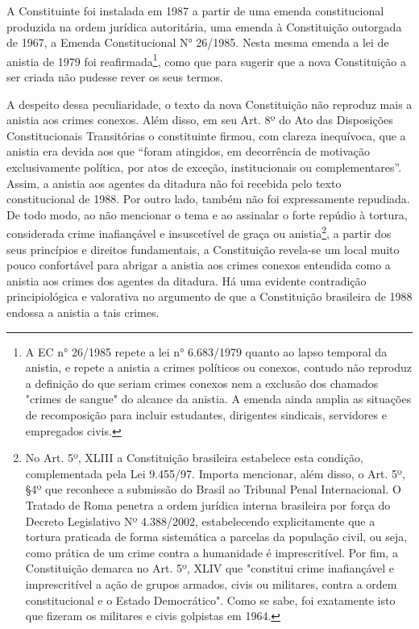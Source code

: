 A Constituinte foi instalada em 1987 a partir de uma emenda
constitucional produzida na ordem jurídica autoritária, uma emenda à
Constituição outorgada de 1967, a Emenda Constitucional N° 26/1985.
Nesta mesma emenda a lei de anistia de 1979 foi reafirmada\footnote{A EC
  n° 26/1985 repete a lei n° 6.683/1979 quanto ao lapso temporal da
  anistia, e repete a anistia a crimes políticos ou conexos, contudo não
  reproduz a definição do que seriam crimes conexos nem a exclusão dos
  chamados "crimes de sangue" do alcance da anistia. A emenda ainda
  amplia as situações de recomposição para incluir estudantes,
  dirigentes sindicais, servidores e empregados civis.}, como que para
sugerir que a nova Constituição a ser criada não pudesse rever os seus
termos.

A despeito dessa peculiaridade, o texto da nova Constituição não
reproduz mais a anistia aos crimes conexos. Além disso, em seu Art. 8º
do Ato das Disposições Constitucionais Transitórias o constituinte
firmou, com clareza inequívoca, que a anistia era devida aos que ``foram
atingidos, em decorrência de motivação exclusivamente política, por atos
de exceção, institucionais ou complementares''. Assim, a anistia aos
agentes da ditadura não foi recebida pelo texto constitucional de 1988.
Por outro lado, também não foi expressamente repudiada. De todo modo, ao
não mencionar o tema e ao assinalar o forte repúdio à tortura,
considerada crime inafiançável e insuscetível de graça ou
anistia\footnote{No Art. 5º, XLIII a Constituição brasileira estabelece
  esta condição, complementada pela Lei 9.455/97. Importa mencionar,
  além disso, o Art. 5º, §4º que reconhece a submissão do Brasil ao
  Tribunal Penal Internacional. O Tratado de Roma penetra a ordem
  jurídica interna brasileira por força do Decreto Legislativo Nº
  4.388/2002, estabelecendo explicitamente que a tortura praticada de
  forma sistemática a parcelas da população civil, ou seja, como prática
  de um crime contra a humanidade é imprescritível. Por fim, a
  Constituição demarca no Art. 5º, XLIV que "constitui crime
  inafiançável e imprescritível a ação de grupos armados, civis ou
  militares, contra a ordem constitucional e o Estado Democrático". Como
  se sabe, foi exatamente isto que fizeram os militares e civis
  golpistas em 1964.}, a partir dos seus princípios e direitos
fundamentais, a Constituição revela-se um local muito pouco confortável
para abrigar a anistia aos crimes conexos entendida como a anistia aos
crimes dos agentes da ditadura. Há uma evidente contradição
principiológica e valorativa no argumento de que a Constituição
brasileira de 1988 endossa a anistia a tais crimes.

